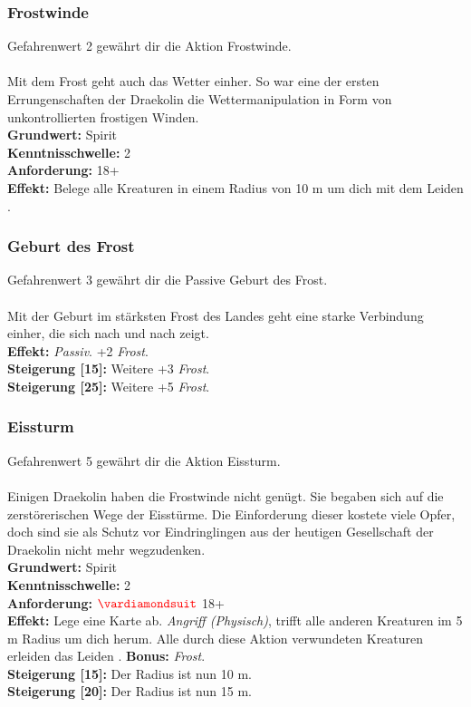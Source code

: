 \subsubsection*{ Frostwinde} \label{sk:frostwinde}
Gefahrenwert 2 gewährt dir die Aktion Frostwinde.\\
\\
Mit dem Frost geht auch das Wetter einher. So war eine der ersten Errungenschaften der Draekolin die Wettermanipulation in Form von unkontrollierten frostigen Winden. \\
\textbf{Grundwert:} Spirit \\
\textbf{Kenntnisschwelle:} 2 \\
\textbf{Anforderung:} 18+ \\
\textbf{Effekt:} Belege alle Kreaturen in einem Radius von 10 m um dich mit dem Leiden .

\subsubsection*{ Geburt des Frost} \label{sk:geburt_des_frost}
Gefahrenwert 3 gewährt dir die Passive Geburt des Frost.\\
\\
Mit der Geburt im stärksten Frost des Landes geht eine starke Verbindung einher, die sich nach und nach zeigt.\\
\textbf{Effekt:} \textit{Passiv}. +2 \textit{ Frost}.\\
\textbf{Steigerung [15]:} Weitere +3 \textit{ Frost}.\\
\textbf{Steigerung [25]:} Weitere +5 \textit{ Frost}.

\subsubsection*{ Eissturm} \label{sk:eissturm}
Gefahrenwert 5 gewährt dir die Aktion Eissturm.\\
\\
Einigen Draekolin haben die Frostwinde nicht genügt. Sie begaben sich auf die zerstörerischen Wege der Eisstürme. Die Einforderung dieser kostete viele Opfer, doch sind sie als Schutz vor Eindringlingen aus der heutigen Gesellschaft der Draekolin nicht mehr wegzudenken. \\
\textbf{Grundwert:} Spirit \\
\textbf{Kenntnisschwelle:} 2 \\
\textbf{Anforderung:} $\Karo{}$ 18+ \\
\textbf{Effekt:} Lege eine Karte ab. \textit{Angriff (Physisch)}, trifft alle anderen Kreaturen im 5 m Radius um dich herum. Alle durch diese Aktion verwundeten Kreaturen erleiden das Leiden .
\textbf{Bonus:} \textit{ Frost}.\\
\textbf{Steigerung [15]:} Der Radius ist nun 10 m.\\
\textbf{Steigerung [20]:} Der Radius ist nun 15 m.

